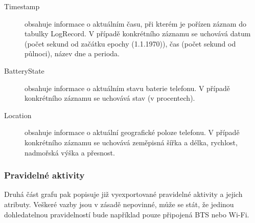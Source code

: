 \documentclass[thesis=M,czech]{FITthesis}[2012/06/26]
\begin{document}
\begin{description}
\item[Timestamp]
obsahuje informace o aktuálním času, při kterém je pořízen záznam do tabulky LogRecord. V případě konkrétního záznamu se uchovává datum (počet sekund od začátku epochy (1.1.1970)), čas (počet sekund od půlnoci), název dne a perioda.

\item[BatteryState]
obsahuje informace o aktuálním stavu baterie telefonu. V případě konkrétního záznamu se uchovává stav (v procentech).

\item[Location]
obsahuje informace o aktuální geografické poloze telefonu. V případě konkrétního záznamu se uchovává zeměpisná šířka a délka, rychlost, nadmořská výška a přesnost.
\end{description}

\subsubsection*{Pravidelné aktivity}
Druhá část grafu pak popisuje již vyexportované pravidelné aktivity a jejich atributy. Veškeré vazby jsou v zásadě nepovinné, může se stát, že jedinou dohledatelnou pravidelností bude například pouze připojená BTS nebo Wi-Fi.
\end{document}
